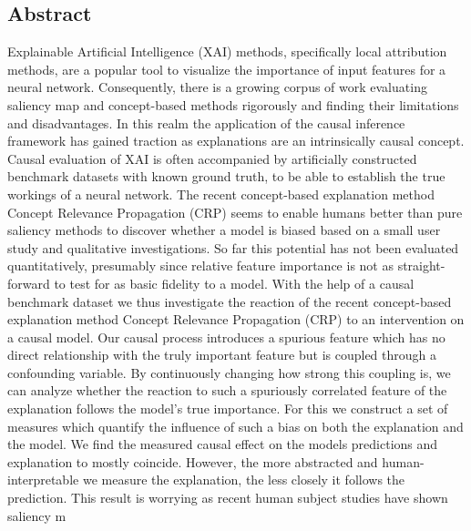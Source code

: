 \pagestyle{empty}
\subsection*{Abstract}


Explainable Artificial Intelligence (XAI) methods, specifically local attribution methods, are a popular tool to visualize the importance of input features for a neural network.
Consequently, there is a growing corpus of work evaluating saliency map and concept-based methods rigorously and finding their limitations and disadvantages. In this realm the application of the causal inference framework has gained traction as explanations are an intrinsically causal concept. Causal evaluation of XAI is often accompanied by artificially constructed benchmark datasets with known ground truth, to be able to establish the true workings of a neural network. 
The recent concept-based explanation method Concept Relevance Propagation (CRP) seems to enable humans better than pure saliency methods to discover whether a model is biased based on a small user study and qualitative investigations. So far this potential has not been evaluated quantitatively, presumably since relative feature importance is not as straight-forward to test for as basic fidelity to a model. 
With the help of a causal benchmark dataset we thus investigate the reaction of the recent concept-based explanation method Concept Relevance Propagation (CRP) to an intervention on a causal model. Our causal process introduces a spurious feature which has no direct relationship with the truly important feature but is coupled through a confounding variable. By continuously changing how strong this coupling is, we can analyze whether the reaction to such a spuriously correlated feature of the explanation follows the model's true importance. For this we construct a set of measures which quantify the influence of such a bias on both the explanation and the model. We find the measured causal effect on the models predictions and explanation to mostly coincide. However, the more abstracted and human-interpretable we measure the explanation, the less closely it follows the prediction. This result is worrying as recent human subject studies have shown saliency m

